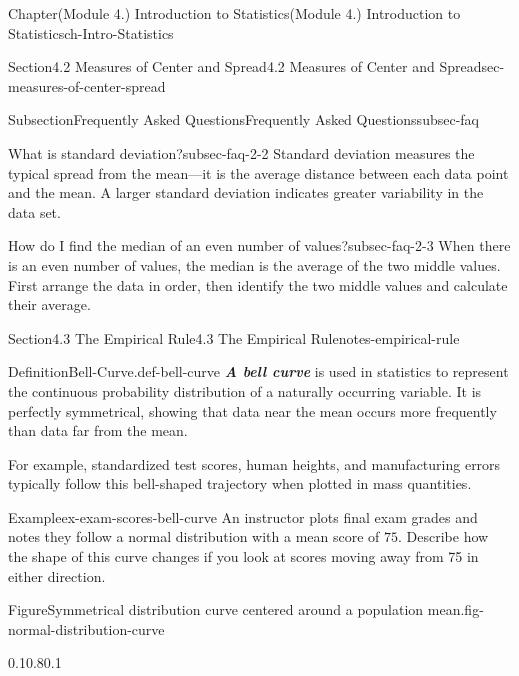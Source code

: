 \documentclass[oneside,10pt,]{book}
\newcommand{\alert}[1]{\textbf{\textit{#1}}}
\begin{document}
\begin{chapterptx}{Chapter}{(Module 4.) Introduction to Statistics}{}{(Module 4.) Introduction to Statistics}{}{}{ch-Intro-Statistics}
\begin{sectionptx}{Section}{4.2 Measures of Center and Spread}{}{4.2 Measures of Center and Spread}{}{}{sec-measures-of-center-spread}
\begin{subsectionptx}{Subsection}{Frequently Asked Questions}{}{Frequently Asked Questions}{}{}{subsec-faq}
\begin{descriptionlist}
\begin{dlimedium}{What is standard deviation?}{subsec-faq-2-2}%
Standard deviation measures the typical spread from the mean—it is the average distance between each data point and the mean. A larger standard deviation indicates greater variability in the data set.%
\end{dlimedium}%
\begin{dlimedium}{How do I find the median of an even number of values?}{subsec-faq-2-3}%
When there is an even number of values, the median is the average of the two middle values. First arrange the data in order, then identify the two middle values and calculate their average.%
\end{dlimedium}%
\end{descriptionlist}
\end{subsectionptx}
\end{sectionptx}
%
%
\typeout{************************************************}
\typeout{************************************************}
%
\begin{sectionptx}{Section}{4.3 The Empirical Rule}{}{4.3 The Empirical Rule}{}{}{notes-empirical-rule}
\begin{definition}{Definition}{Bell-Curve.}{def-bell-curve}%
\alert{A bell curve} is used in statistics to represent the continuous probability distribution of a naturally occurring variable. It is perfectly symmetrical, showing that data near the mean occurs more frequently than data far from the mean.%
\end{definition}
For example, standardized test scores, human heights, and manufacturing errors typically follow this bell-shaped trajectory when plotted in mass quantities.%
\begin{example}{Example}{}{ex-exam-scores-bell-curve}%
An instructor plots final exam grades and notes they follow a normal distribution with a mean score of \(75\). Describe how the shape of this curve changes if you look at scores moving away from 75 in either direction.%
\begin{figureptx}{Figure}{Symmetrical distribution curve centered around a population mean.}{fig-normal-distribution-curve}{}%
\begin{image}{0.1}{0.8}{0.1}{}%
\resizebox{\linewidth}{!}{%
\begin{tikzpicture}
\begin{axis}[
    no markers, 
    domain=40:110, 
    samples=100, 
    ymin=0, ymax=0.045,
    axis lines=left, 
    xlabel={Exam Scores}, 

\end{axis}
\end{tikzpicture}}
\end{image}
\end{figureptx}
\end{example}
\end{sectionptx}
\end{chapterptx}
\end{document}
